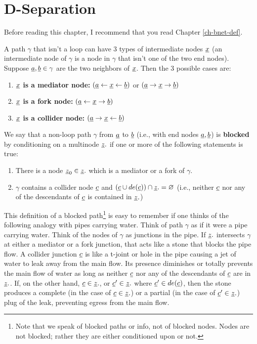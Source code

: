 \chapter{D-Separation}
\label{ch-dsep}
Before reading this chapter,
I  recommend
that you
read
Chapter \ref{ch-bnet-def}.


A path $\gamma$ that
isn't a loop can have 
3 types of intermediate
 nodes $\rvx$ (an intermediate
 node of $\gamma$
 is a node in $\gamma$ that 
isn't one
of the two end nodes).
Suppose $\rva,\rvb\in \gamma$
are the two neighbors of $\rvx$. Then
the 3 possible cases are:
\begin{enumerate}
\item {\bf$\rvx$ is a mediator node:}
$(\rva\larrow\rvx\larrow \rvb)$
or
$(\rva\rarrow\rvx\rarrow \rvb)$
\item {\bf $\rvx$ is a fork node:}
$(\rva\larrow\rvx\rarrow \rvb)$
\item {\bf $\rvx$ is a collider node:}
$(\rva\rarrow\rvx\larrow \rvb)$
\end{enumerate}

We say that a non-loop path 
$\gamma$ 
from $\rva$ to $\rvb$ (i.e., with
end nodes $\rva, \rvb$)
is {\bf blocked}
by conditioning on a multinode $\rvz.$
if one or more 
of the following
statements is true:

\begin{enumerate}
\item 
There is a node $\rvz_0\in \rvz.$
which is a mediator 
or a fork of $\gamma$.
\item
$\gamma$ contains a collider
node $\rvc$
and 
$(\rvc\cup de(\rvc))\cap\rvz.=\eset$
(i.e., neither 
$\rvc$ nor 
any of the descendants of $\rvc$
is contained in $\rvz.$)
\end{enumerate}

This definition of a blocked 
path\footnote{Note
that we speak of 
blocked paths or info,
not of blocked nodes.
Nodes are not blocked;
rather they are either 
conditioned upon
or not.}
 is easy to remember
if one thinks 
of the following analogy
with pipes carrying water.
Think of path
$\gamma$ as if it
were a pipe
carrying water.
Think of
the nodes 
of $\gamma$ as junctions in the pipe.
If $\rvz.$
intersects $\gamma$
at either a mediator
or a fork junction,
that acts like a stone
that blocks the pipe flow.
A collider junction $\rvc$
is like a t-joint or hole in the pipe
causing a jet of water to leak away from the main flow.
Its presence
diminishes or totally 
prevents the main flow of  water
as long
as neither
$\rvc$
nor any of
the descendants 
of $\rvc$
are in $\rvz.$.
If,
on the 
other hand,
$\rvc\in\rvz.$,
or $\rvc'\in \rvz.$
where $\rvc'\in de(\rvc)$,
then the stone
produces
a complete
(in the case of $\rvc\in\rvz.$)
or a partial 
(in the case of $\rvc'\in\rvz.$)
plug of the leak,
preventing egress from the main flow.

